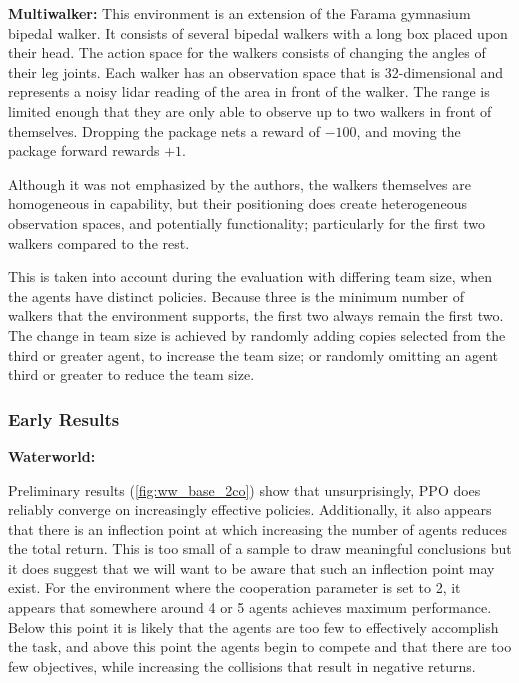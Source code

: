 \phantom{\hfil} %

\textbf{Multiwalker:}
This environment is an extension of the Farama gymnasium bipedal walker.
It consists of several bipedal walkers with a long box placed upon their head.
The action space for the walkers consists of changing the angles of their 
leg joints. Each walker has an observation space that is 32-dimensional 
and represents a noisy lidar reading of the area in front of the walker.
The range is limited enough that they are only able to observe up to two 
walkers in front of themselves. 
Dropping the package nets a reward of \(-100\), 
and moving the package forward rewards \(+1\).

Although it was not emphasized by the authors, the walkers themselves
are homogeneous in capability, but their positioning does create 
heterogeneous observation spaces, and potentially functionality;
particularly for the first two walkers compared to the rest.

This is taken into account during the evaluation with differing team size,
when the agents have distinct policies.
Because three is the minimum number of walkers that the environment
supports, the first two always remain the first two. 
The change in team size is achieved by randomly adding copies selected from 
the third or greater agent, to increase the team size; or randomly omitting
an agent third or greater to reduce the team size.

\subsubsection*{Early Results}

\textbf{Waterworld:}

Preliminary results (\cref{fig:ww_base_2co}) show that unsurprisingly,
PPO does reliably converge on increasingly effective policies.
Additionally, it also appears that there is an inflection point 
at which increasing the number of agents reduces the total return.
This is too small of a sample to draw meaningful conclusions but it 
does suggest that we will want to be aware that such an inflection point
may exist. For the environment where the cooperation parameter is set to 2,
it appears that somewhere around 4 or 5 agents achieves maximum performance. 
Below this point it is likely that the agents are too few to effectively 
accomplish the task, 
and above this point the agents begin to compete and that there are too
few objectives, while increasing the collisions that result in negative
returns.

